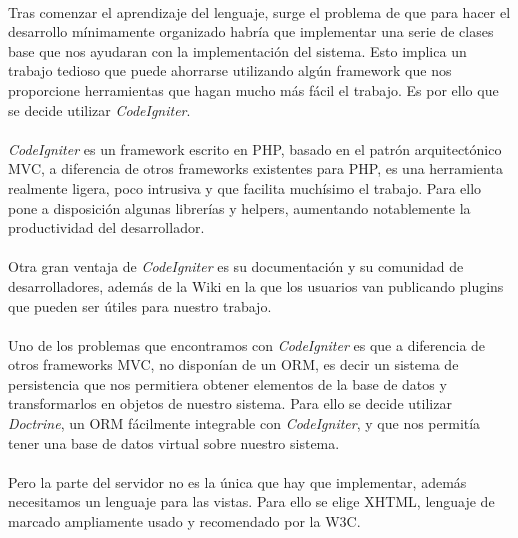\documentclass[a4paper,11pt]{article} %
\begin{document}
\paragraph{}
Tras comenzar el aprendizaje del lenguaje, surge el problema de que para hacer el desarrollo mínimamente organizado habría que implementar una serie de clases base que nos ayudaran con la implementación del sistema. Esto implica un trabajo tedioso que puede ahorrarse utilizando algún framework que nos proporcione herramientas que hagan mucho más fácil el trabajo. Es por ello que se decide utilizar {\em CodeIgniter}.
\paragraph{}
{\em CodeIgniter} es un framework escrito en PHP, basado en el patrón arquitectónico MVC, a diferencia de otros frameworks existentes para PHP, es una herramienta realmente ligera, poco intrusiva y que facilita muchísimo el trabajo. Para ello pone a disposición algunas librerías y helpers, aumentando notablemente la productividad del desarrollador.
\paragraph{}
Otra gran ventaja de {\em CodeIgniter} es su documentación y su comunidad de desarrolladores, además de la Wiki en la que los usuarios van publicando plugins que pueden ser útiles para nuestro trabajo.
\paragraph{}
Uno de los problemas que encontramos con {\em CodeIgniter} es que a diferencia de otros frameworks MVC, no disponían de un ORM, es decir un sistema de persistencia que nos permitiera obtener elementos de la base de datos y transformarlos en objetos de nuestro sistema. Para ello se decide utilizar {\em Doctrine}, un ORM fácilmente integrable con {\em CodeIgniter}, y que nos permitía tener una base de datos virtual sobre nuestro sistema.
\paragraph{}
Pero la parte del servidor no es la única que hay que implementar, además necesitamos un lenguaje para las vistas. Para ello se elige XHTML, lenguaje de marcado ampliamente usado y recomendado por la W3C.
\paragraph{}
\end{document}

